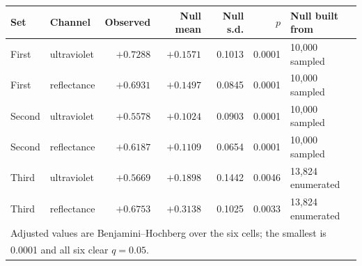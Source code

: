 \begin{tabular}{llrrrrl}
\hline
Set & Channel & Observed & Null mean & Null s.d. & $p$ & Null built from \\
\hline
First & ultraviolet & $+0.7288$ & $+0.1571$ & 0.1013 & 0.0001 & 10,000 sampled \\
First & reflectance & $+0.6931$ & $+0.1497$ & 0.0845 & 0.0001 & 10,000 sampled \\
Second & ultraviolet & $+0.5578$ & $+0.1024$ & 0.0903 & 0.0001 & 10,000 sampled \\
Second & reflectance & $+0.6187$ & $+0.1109$ & 0.0654 & 0.0001 & 10,000 sampled \\
Third & ultraviolet & $+0.5669$ & $+0.1898$ & 0.1442 & 0.0046 & 13,824 enumerated \\
Third & reflectance & $+0.6753$ & $+0.3138$ & 0.1025 & 0.0033 & 13,824 enumerated \\
\hline
\multicolumn{7}{l}{\footnotesize Adjusted values are Benjamini--Hochberg over the six cells; the smallest is }\\
\multicolumn{7}{l}{\footnotesize 0.0001 and all six clear $q=0.05$.}\\
\end{tabular}
